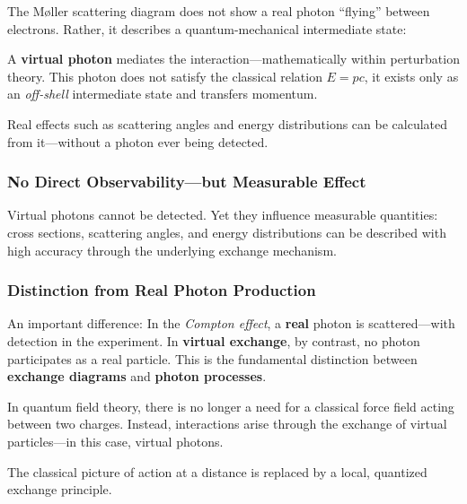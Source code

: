 \begin{tcolorbox}[didaktikbox, title=What Does the Feynman Diagram Really Show?]
	\label{box:Was zeigt das Feynman-Diagramm wirklich}
	The Møller scattering diagram does not show a real photon “flying” between electrons. Rather, it describes a quantum-mechanical intermediate state:
	
	A \textbf{virtual photon} mediates the interaction—mathematically within perturbation theory. This photon does not satisfy the classical relation $E = pc$, it exists only as an \emph{off-shell} intermediate state and transfers momentum.
	
	Real effects such as scattering angles and energy distributions can be calculated from it—without a photon ever being detected.
\end{tcolorbox}

\subsubsection*{No Direct Observability—but Measurable Effect}
Virtual photons cannot be detected. Yet they influence measurable quantities: cross sections, scattering angles, and energy distributions can be described with high accuracy through the underlying exchange mechanism.

\subsubsection*{Distinction from Real Photon Production}
An important difference: In the \emph{Compton effect}, a \textbf{real} photon is scattered—with detection in the experiment. In \textbf{virtual exchange}, by contrast, no photon participates as a real particle. This is the fundamental distinction between \textbf{exchange diagrams} and \textbf{photon processes}.

\vspace{1em}
\begin{tcolorbox}[didaktikbox, title=No Need for an “Invisible Force”]
	\label{box:unsichtbare Kraft}
	In quantum field theory, there is no longer a need for a classical force field acting between two charges. Instead, interactions arise through the exchange of virtual particles—in this case, virtual photons.
	
	The classical picture of action at a distance is replaced by a local, quantized exchange principle.
\end{tcolorbox}
\newpage
\noindent
